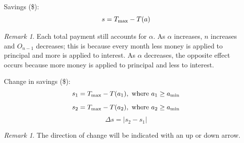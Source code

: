 \documentclass[12pt,letterpaper,oneside]{article}
\theoremstyle{remark} %
\newtheorem{remark}[theorem]{Remark}
\begin{document}
	\vspace{12pt}
	\setlength\parindent{0pt} Savings (\$):
	$$s=T_{\rm{max}}-T(a)$$

	\vspace{12pt}
	\begin{remark}
	Each total payment still accounts for $\alpha$. As $\alpha$ increases, $n$ increases and $O_{n-1}$ decreases; this is because every month less money is applied to principal and more is applied to interest. As $\alpha$ decreases, the opposite effect occurs because more money is applied to principal and less to interest.
	\end{remark}

	\vspace{12pt}
	\setlength\parindent{0pt} Change in savings (\$):
	$$s_{1}=T_{\rm{max}}-T(a_{1}),\mbox{ where }a_{1}\geq a_{\rm{min}}$$
	$$s_{2}=T_{\rm{max}}-T(a_{2}),\mbox{ where }a_{2}\geq a_{\rm{min}}$$
	$$\Delta s=\left|s_{2}-s_{1}\right|$$

	\vspace{12pt}
	\begin{remark}
	The direction of change will be indicated with an up or down arrow.
	\end{remark}
\end{document}
